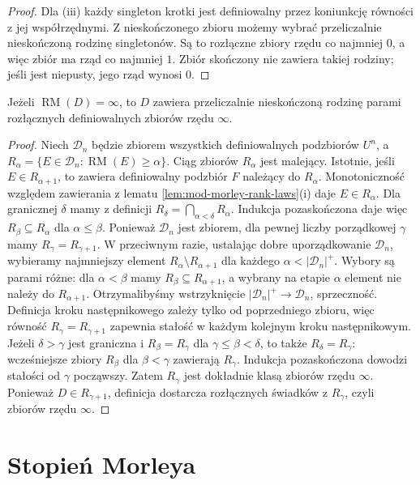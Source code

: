 \begin{proof}
Dla (iii) każdy singleton krotki jest definiowalny
przez koniunkcję równości z jej współrzędnymi.
Z nieskończonego zbioru możemy wybrać
przeliczalnie nieskończoną rodzinę singletonów.
Są to rozłączne zbiory rzędu co najmniej $0$,
a więc zbiór ma rząd co najmniej $1$.
Zbiór skończony nie zawiera takiej rodziny;
jeśli jest niepusty, jego rząd wynosi $0$.
\end{proof}

\begin{lemat}
\label{lem:mod-morley-infinite-splitting}
Jeżeli $\operatorname{RM}(D)=\infty$, to $D$
zawiera przeliczalnie nieskończoną rodzinę
parami rozłącznych definiowalnych zbiorów
rzędu $\infty$.
\end{lemat}
\begin{proof}
Niech $\mathcal D_n$ będzie zbiorem wszystkich
definiowalnych podzbiorów $U^n$, a
$R_\alpha=\{E\in\mathcal D_n:
\operatorname{RM}(E)\geq\alpha\}$.
Ciąg zbiorów $R_\alpha$ jest malejący.
Istotnie, jeśli $E\in R_{\alpha+1}$,
to zawiera definiowalny podzbiór $F$ należący
do $R_\alpha$. Monotoniczność względem zawierania
z lematu \ref{lem:mod-morley-rank-laws}(i)
daje $E\in R_\alpha$. Dla granicznej $\delta$
mamy z definicji $R_\delta=\bigcap_{\alpha<\delta}R_\alpha$.
Indukcja pozaskończona daje więc
$R_\beta\subseteq R_\alpha$ dla $\alpha\leq\beta$.
Ponieważ $\mathcal D_n$ jest zbiorem,
dla pewnej liczby porządkowej $\gamma$
mamy $R_\gamma=R_{\gamma+1}$.
W przeciwnym razie, ustalając dobre uporządkowanie
$\mathcal D_n$, wybieramy najmniejszy element
$R_\alpha\setminus R_{\alpha+1}$ dla każdego
$\alpha<|\mathcal D_n|^+$. Wybory są parami różne:
dla $\alpha<\beta$ mamy $R_\beta\subseteq R_{\alpha+1}$,
a wybrany na etapie $\alpha$ element nie należy
do $R_{\alpha+1}$. Otrzymalibyśmy wstrzyknięcie
$|\mathcal D_n|^+\to\mathcal D_n$, sprzeczność.
Definicja kroku następnikowego zależy tylko
od poprzedniego zbioru, więc równość
$R_\gamma=R_{\gamma+1}$ zapewnia stałość
w każdym kolejnym kroku następnikowym.
Jeżeli $\delta>\gamma$ jest graniczna i
$R_\beta=R_\gamma$ dla $\gamma\leq\beta<\delta$,
to także $R_\delta=R_\gamma$: wcześniejsze
zbiory $R_\beta$ dla $\beta<\gamma$ zawierają
$R_\gamma$. Indukcja pozaskończona dowodzi
stałości od $\gamma$ począwszy.
Zatem $R_\gamma$ jest dokładnie klasą zbiorów
rzędu $\infty$.
Ponieważ $D\in R_{\gamma+1}$, definicja
dostarcza rozłącznych świadków z $R_\gamma$,
czyli zbiorów rzędu $\infty$.
\end{proof}

\section{Stopień Morleya}


